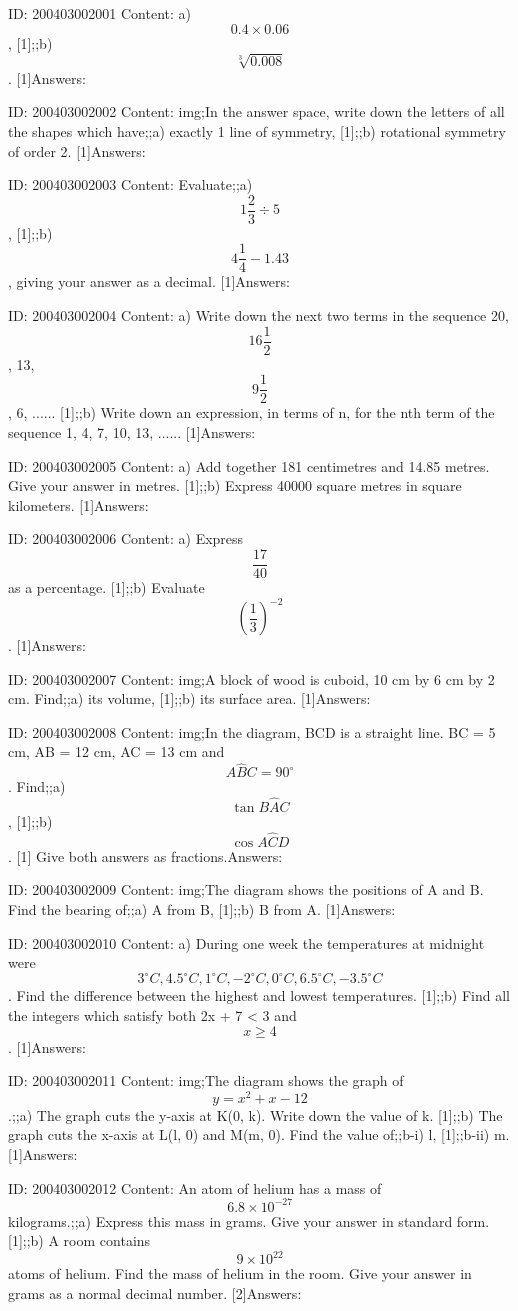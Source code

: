 \documentclass{article}
\begin{document}
ID: 200403002001
Content:
a) $$0.4 \times 0.06$$, [1];;b) $$\sqrt[3]{0.008}$$. [1]Answers:

ID: 200403002002
Content:
img;In the answer space, write down the letters of all the shapes which have;;a) exactly 1 line of symmetry, [1];;b) rotational symmetry of order 2. [1]Answers:

ID: 200403002003
Content:
Evaluate;;a) $$1\frac{2}{3}\div 5$$, [1];;b) $$4\frac{1}{4}-1.43$$, giving your answer as a decimal. [1]Answers:

ID: 200403002004
Content:
a) Write down the next two terms in the sequence 20, $$16\frac{1}{2}$$, 13, $$9\frac{1}{2}$$, 6, ...... [1];;b) Write down an expression, in terms of n, for the nth term of the sequence 1, 4, 7, 10, 13, ......  [1]Answers:

ID: 200403002005
Content:
a) Add together 181 centimetres and 14.85 metres. Give your answer in metres. [1];;b) Express 40000 square metres in square kilometers. [1]Answers:

ID: 200403002006
Content:
a) Express $$\frac{17}{40}$$ as a percentage. [1];;b) Evaluate $$(\frac{1}{3})^{-2}$$. [1]Answers:

ID: 200403002007
Content:
img;A block of wood is cuboid, 10 cm by 6 cm by 2 cm. Find;;a) its volume, [1];;b) its surface area. [1]Answers:

ID: 200403002008
Content:
img;In the diagram, BCD is a straight line. BC = 5 cm, AB = 12 cm, AC = 13 cm and $$A \hat BC=90^{\circ}$$. Find;;a) $$\tan B \hat AC$$, [1];;b) $$\cos A \hat CD$$. [1]  Give both answers as fractions.Answers:

ID: 200403002009
Content:
img;The diagram shows the positions of A and B. Find the bearing of;;a) A from B, [1];;b) B from A. [1]Answers:

ID: 200403002010
Content:
a) During one week the temperatures at midnight were $$3^{\circ}C, 4.5^{\circ}C, 1^{\circ}C, -2^{\circ}C, 0^{\circ}C, 6.5^{\circ}C, -3.5^{\circ}C$$. Find the difference between the highest and lowest temperatures. [1];;b) Find all the integers which satisfy both 2x + 7 < 3 and $$x  \geq  4$$. [1]Answers:

ID: 200403002011
Content:
img;The diagram shows the graph of $$y= x^{2} + x -12$$.;;a) The graph cuts the y-axis at K(0, k). Write down the value of k. [1];;b) The graph cuts the x-axis at L(l, 0) and M(m, 0). Find the value of;;b-i) l, [1];;b-ii) m. [1]Answers:

ID: 200403002012
Content:
An atom of helium has a mass of $$6.8 \times 10^{-27}$$ kilograms.;;a) Express this mass in grams. Give your answer in standard form. [1];;b) A room contains $$9 \times 10^{22}$$ atoms of helium. Find the mass of helium in the room. Give your answer in grams as a normal decimal number. [2]Answers:
\end{document}
